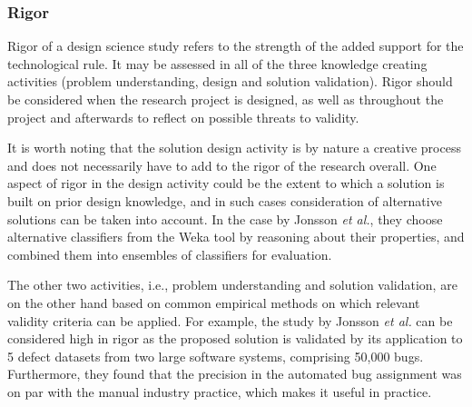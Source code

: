 \documentclass[graybox]{svmult}
\begin{document}
\subsubsection{Rigor %
} 
Rigor of a design science study refers to the strength of the added support for the technological rule. It may be assessed in all of the three knowledge creating activities (problem understanding, design and solution validation). 
Rigor should be considered when the research project is designed, as well as throughout the project and afterwards to reflect on possible threats to validity. 

It is worth noting that the solution design activity is by nature a creative process and does not necessarily have to add to the rigor of the research overall. One aspect of rigor in the design activity could be the extent to which a solution is built on prior design knowledge, and in such cases consideration of alternative solutions can be taken into account. 
In the case by Jonsson \emph{et al.}, they choose alternative classifiers from the Weka tool by reasoning about their properties, and combined them into ensembles of classifiers for evaluation.

The other two activities, i.e., problem understanding and solution validation, are on the other hand based on common empirical methods on which relevant validity criteria can be applied. For example, the study by Jonsson \emph{et al.} can be considered high in rigor as the proposed solution is validated by its application to 5 defect datasets from two large software systems, comprising 50,000 bugs.  Furthermore, they found that the precision in the automated bug assignment was on par with the manual industry practice, which makes it useful in practice.
\end{document}
